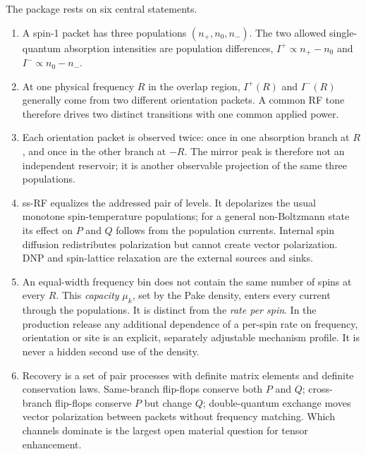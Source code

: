 \documentclass[11pt]{article}
\newcommand{\Iplus}{I^{+}}
\newcommand{\Iminus}{I^{-}}
\begin{document}
The package rests on six central statements.

\begin{enumerate}
  \item A spin-1 packet has three populations \((n_{+},n_{0},n_{-})\).  The two allowed single-quantum absorption intensities are population differences, \(\Iplus\propto n_{+}-n_{0}\) and \(\Iminus\propto n_{0}-n_{-}\).
  \item At one physical frequency \(R\) in the overlap region, \(\Iplus(R)\) and \(\Iminus(R)\) generally come from two different orientation packets.  A common RF tone therefore drives two distinct transitions with one common applied power.
  \item Each orientation packet is observed twice: once in one absorption branch at \(R\), and once in the other branch at \(-R\).  The mirror peak is therefore not an independent reservoir; it is another observable projection of the same three populations.
  \item ss-RF equalizes the addressed pair of levels.  It depolarizes the usual monotone spin-temperature populations; for a general non-Boltzmann state its effect on \(P\) and \(Q\) follows from the population currents.  Internal spin diffusion redistributes polarization but cannot create vector polarization.  DNP and spin-lattice relaxation are the external sources and sinks.
  \item An equal-width frequency bin does not contain the same number of spins at every \(R\).  This \emph{capacity} \(\mu_k\), set by the Pake density, enters every current through the populations.  It is distinct from the \emph{rate per spin}.  In the production release any additional dependence of a per-spin rate on frequency, orientation or site is an explicit, separately adjustable mechanism profile.  It is never a hidden second use of the density.
  \item Recovery is a set of pair processes with definite matrix elements and definite conservation laws.  Same-branch flip-flops conserve both \(P\) and \(Q\); cross-branch flip-flops conserve \(P\) but change \(Q\); double-quantum exchange moves vector polarization between packets without frequency matching.  Which channels dominate is the largest open material question for tensor enhancement.
\end{enumerate}
\end{document}
